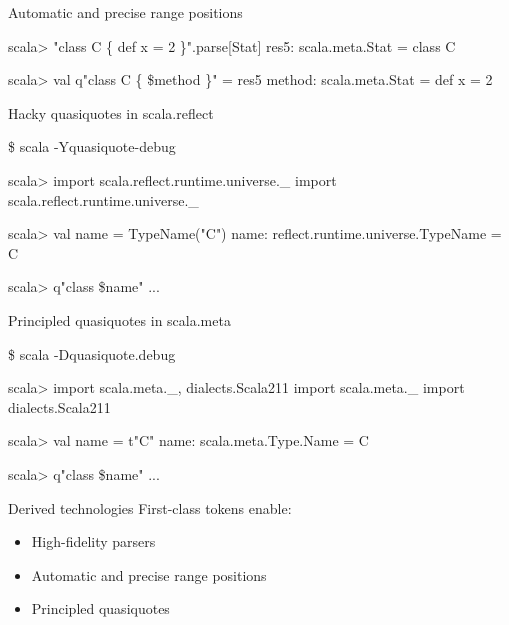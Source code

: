 \documentclass[svgnames,dvipsnames,hyperref={bookmarks=false},usepdftitle=false]{beamer}
\begin{document}
\begin{frame}[fragile]{Automatic and precise range positions}
\begin{semiverbatim}
scala> "class C \{ def x = 2 \}".parse[Stat]
res5: scala.meta.Stat = class C

scala> val q"class C \{ \$method \}" = res5
method: scala.meta.Stat = def x = 2

\end{semiverbatim}
\end{frame}

\begin{frame}[fragile]{Hacky quasiquotes in scala.reflect}
\begin{semiverbatim}
\$ scala -Yquasiquote-debug

scala> import scala.reflect.runtime.universe.\_
import scala.reflect.runtime.universe.\_

scala> val name = TypeName("C")
name: reflect.runtime.universe.TypeName = C

scala> q"class \alert<2->{\$name}"
...
\end{semiverbatim}
\end{frame}

\begin{frame}[fragile]{Principled quasiquotes in scala.meta}
\begin{semiverbatim}
\$ scala -Dquasiquote.debug

scala> import scala.meta.\_, dialects.Scala211
import scala.meta.\_
import dialects.Scala211

scala> val name = t"C"
name: scala.meta.Type.Name = C

scala> q"class \alert<2->{\$name}"
...
\end{semiverbatim}
\end{frame}

\begin{frame}{Derived technologies}
First-class tokens enable:
\begin{itemize}
\item High-fidelity parsers
\item Automatic and precise range positions
\item Principled quasiquotes
\end{itemize}
\end{frame}
\end{document}
